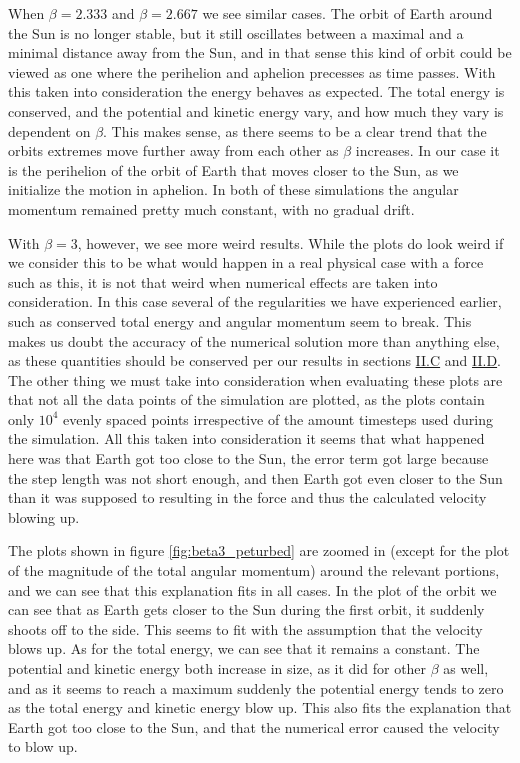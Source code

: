 \documentclass[reprint,english,notitlepage]{revtex4-1}  %
\begin{document}
When $\beta = 2.333$ and $\beta = 2.667$ we see similar cases. The orbit of Earth around the Sun is no longer stable, but it still oscillates between a maximal and a minimal distance away from the Sun, and in that sense this kind of orbit could be viewed as one where the perihelion and aphelion precesses as time passes. With this taken into consideration the energy behaves as expected. The total energy is conserved, and the potential and kinetic energy vary, and how much they vary is dependent on $\beta$. This makes sense, as there seems to be a clear trend that the orbits extremes move further away from each other as $\beta$ increases. In our case it is the perihelion of the orbit of Earth that moves closer to the Sun, as we initialize the motion in aphelion. In both of these simulations the angular momentum remained pretty much constant, with no gradual drift.

With $\beta = 3$, however, we see more weird results. While the plots do look weird if we consider this to be what would happen in a real physical case with a force such as this, it is not that weird when numerical effects are taken into consideration. In this case several of the regularities we have experienced earlier, such as conserved total energy and angular momentum seem to break. This makes us doubt the accuracy of the numerical solution more than anything else, as these quantities should be conserved per our results in sections \hyperref[sec:II:c]{II.C} and \hyperref[sec:II:d]{II.D}. The other thing we must take into consideration when evaluating these plots are that not all the data points of the simulation are plotted, as the plots contain only $10^4$ evenly spaced points irrespective of the amount timesteps used during the simulation. All this taken into consideration it seems that what happened here was that Earth got too close to the Sun, the error term got large because the step length was not short enough, and then Earth got even closer to the Sun than it was supposed to resulting in the force and thus the calculated velocity blowing up. 

The plots shown in figure \ref{fig:beta3_peturbed} are zoomed in (except for the plot of the magnitude of the total angular momentum) around the relevant portions, and we can see that this explanation fits in all cases. In the plot of the orbit we can see that as Earth gets closer to the Sun during the first orbit, it suddenly shoots off to the side. This seems to fit with the assumption that the velocity blows up. As for the total energy, we can see that it remains a constant. The potential and kinetic energy both increase in size, as it did for other $\beta$ as well, and as it seems to reach a maximum suddenly the potential energy tends to zero as the total energy and kinetic energy blow up. This also fits the explanation that Earth got too close to the Sun, and that the numerical error caused the velocity to blow up. 
\end{document}
